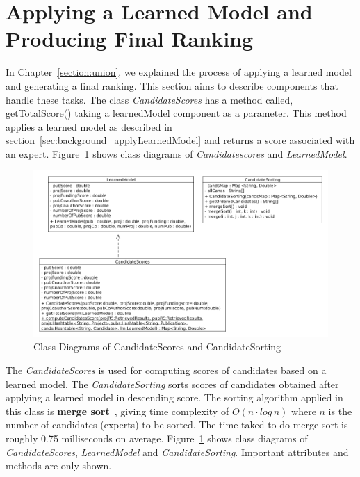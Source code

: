 \section{Applying a Learned Model and Producing Final Ranking}\label{section:applyinglearnedmodel}
In Chapter~\ref{section:union}, we explained the process of applying a learned model and generating a final ranking. 
This section aims to describe components
that handle these tasks. The class \textit{CandidateScores} has a method called, getTotalScore() taking a learnedModel component as a parameter. 
This method applies a learned model as described in section~\ref{sec:background_applyLearnedModel} and returns a score associated with an expert.
Figure~\ref{fig:scoreandsorting} shows class diagrams of \textit{Candidatescores} and \textit{LearnedModel}.

\begin{figure}
\centering
\includegraphics[scale=0.3]{./figures/score&sorting.png}
\caption{Class Diagrams of CandidateScores and CandidateSorting} \label{fig:scoreandsorting} 
\end{figure}

The \textit{CandidateScores} is used for computing scores of candidates based on a learned model. The \textit{CandidateSorting}
sorts scores of candidates obtained after applying a learned model in descending score.
The sorting algorithm applied in this class is \textbf{merge sort}~\cite{mergesort}, giving time complexity of $O(n\cdot log\, n)$ where $n$ is the 
number of candidates (experts) to be sorted. The time taked to do merge sort is roughly 0.75 milliseconds on average.
Figure~\ref{fig:scoreandsorting} shows class diagrams of \textit{CandidateScores}, \textit{LearnedModel} and \textit{CandidateSorting}.
Important attributes and methods are only shown.

